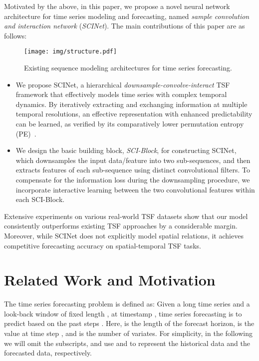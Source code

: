 \documentclass{article}
\begin{document}
Motivated by the above, in this paper, we propose a novel neural network architecture for time series modeling and forecasting, named \textit{sample convolution and interaction network} (\textit{SCINet}). The main contributions of this paper are as follows:  

\begin{figure*}[t]
    \centering
\texttt{[image: img/structure.pdf]}
    \caption{Existing sequence modeling architectures for time series forecasting.}
    \label{fig:related}
     \vspace{-5pt}
\end{figure*}




\begin{itemize}


\item We propose SCINet, a hierarchical \emph{downsample-convolve-interact} TSF framework that effectively models time series with complex temporal dynamics. By iteratively extracting and exchanging information at multiple temporal resolutions, an effective representation with enhanced predictability can be learned, as verified by its comparatively lower permutation entropy (PE)~\citep{Huang2019EnhancedTS}.
\vspace{5pt}
\item We design the basic building block, \textit{SCI-Block}, for constructing SCINet, which downsamples the input data/feature into two sub-sequences, and then extracts features of each sub-sequence using distinct convolutional filters. To compensate for the information loss during the downsampling procedure, we incorporate interactive learning between the two convolutional features within each SCI-Block.
\end{itemize}


Extensive experiments on various real-world TSF datasets show that our model consistently outperforms existing TSF approaches by a considerable margin. Moreover, while SCINet does not explicitly model spatial relations, it achieves competitive forecasting accuracy on spatial-temporal TSF tasks.   

\section{Related Work and Motivation}
\label{sec:related}
The time series forecasting problem is defined as: Given a long time series  and a look-back window of fixed length , at timestamp , 
time series forecasting is to predict  based on the past  steps . Here,  is the length of the forecast horizon,  is the value at time step , and  is the number of variates. 
For simplicity, in the following we will omit the subscripts, and use  and  to represent the historical data and the forecasted data, respectively.
\end{document}
